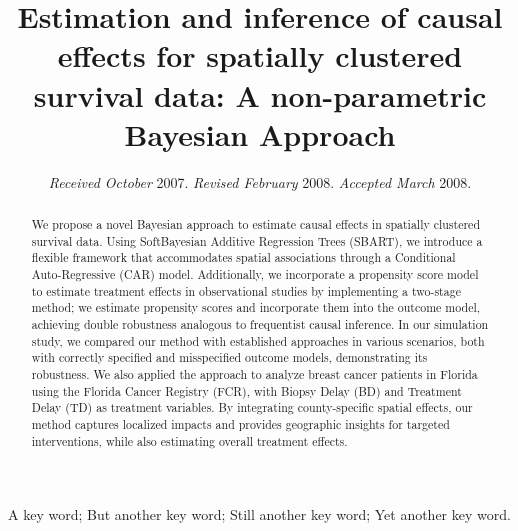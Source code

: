 \documentclass[useAMS,referee]{biom}
\title{
Estimation and inference of causal effects for spatially clustered survival data: A non-parametric Bayesian Approach}
\begin{document}
\date{{\it Received October} 2007. {\it Revised February} 2008.  {\it
Accepted March} 2008.}



\label{firstpage}


\begin{abstract}
We propose a novel Bayesian approach to estimate causal effects in spatially clustered survival data. Using SoftBayesian Additive Regression Trees (SBART), we introduce a flexible framework that accommodates spatial associations through a Conditional Auto-Regressive (CAR) model. Additionally, we incorporate a propensity score model to estimate treatment effects in observational studies by implementing a two-stage method; we estimate propensity scores and incorporate them into the outcome model, achieving double robustness analogous to frequentist causal inference. In our simulation study, we compared our method with established approaches in various scenarios, both with correctly specified and misspecified outcome models, demonstrating its robustness.  We also applied the approach to analyze breast cancer patients in Florida using the Florida Cancer Registry (FCR), with Biopsy Delay (BD) and Treatment Delay (TD) as treatment variables. By integrating county-specific spatial effects, our method captures localized impacts and provides geographic insights for targeted interventions, while also estimating overall treatment effects. 
\end{abstract}

\begin{keywords}
A key word; But another key word; Still another key word; Yet another key word.
\end{keywords}


\maketitle
\end{document}
